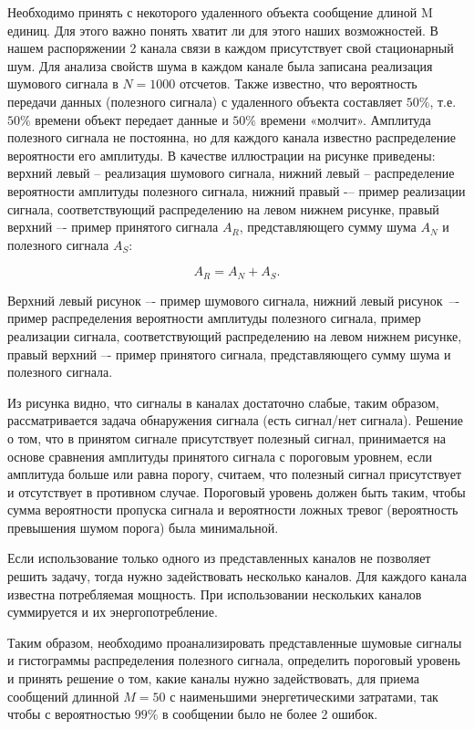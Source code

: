 
Необходимо принять с некоторого удаленного объекта сообщение длиной M единиц. Для этого важно понять хватит ли для этого наших возможностей. В нашем распоряжении 2 канала связи в каждом присутствует свой стационарный шум. Для анализа свойств шума в каждом канале была записана реализация шумового сигнала в $N = 1000$ отсчетов. Также известно, что вероятность передачи данных (полезного сигнала) с удаленного объекта составляет $50\%$, т.е. $50\%$ времени объект передает данные и $50\%$ времени «молчит». Амплитуда полезного сигнала не постоянна, но для каждого канала известно распределение вероятности его амплитуды. В качестве иллюстрации на рисунке приведены: верхний левый -- реализация шумового сигнала, нижний левый -- распределение вероятности амплитуды полезного сигнала, нижний правый -– пример реализации сигнала, соответствующий распределению на левом нижнем рисунке, правый верхний –- пример принятого сигнала $A_R$, представляющего сумму шума $A_N$ и полезного сигнала $A_S$:

$$A_R = A_N + A_S.$$


Верхний левый рисунок –- пример шумового сигнала, нижний левый рисунок~–- пример распределения вероятности амплитуды полезного сигнала, пример реализации сигнала, соответствующий распределению на левом нижнем рисунке, правый верхний –- пример принятого сигнала, представляющего сумму шума и полезного сигнала.

Из рисунка видно, что сигналы в каналах достаточно слабые, таким образом, рассматривается задача обнаружения сигнала (есть сигнал/нет сигнала). Решение о том, что в принятом сигнале присутствует полезный сигнал, принимается на основе сравнения амплитуды принятого сигнала с пороговым уровнем, если амплитуда больше или равна порогу, считаем, что полезный сигнал присутствует и отсутствует в противном случае. Пороговый уровень должен быть таким, чтобы сумма вероятности пропуска сигнала и вероятности ложных тревог (вероятность превышения шумом порога) была минимальной.

Если использование только одного из представленных каналов не позволяет решить задачу, тогда нужно задействовать несколько каналов. Для каждого канала известна потребляемая мощность. При использовании нескольких каналов суммируется и их энергопотребление.

Таким образом, необходимо проанализировать представленные шумовые сигналы и гистограммы распределения полезного сигнала, определить пороговый уровень и принять решение о том, какие каналы нужно задействовать, для приема сообщений длинной $M=50$ с наименьшими энергетическими затратами, так чтобы с вероятностью $99\%$ в сообщении было не более 2 ошибок.

